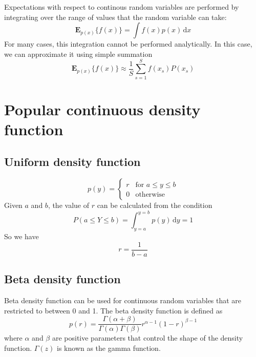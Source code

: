 \documentclass[a4paper,11pt]{article} %
\begin{document}
Expectations with respect to continous random variables are performed by integrating
over the range of values that the random variable can take:
\begin{equation}
\mathbf{E}_{p(x)}\{f(x)\} = \int f(x) p(x)\,\mathrm{d}x
\end{equation}
For many cases, this integration cannot be performed analytically. In this case, we can
approximate it using simple summation
\begin{equation}
\mathbf{E}_{p(x)}\{f(x)\} \approx \frac{1}{S}\sum_{s=1}^{S} f(x_s) P(x_s)
\end{equation}


\section{Popular continuous density function}

\subsection{Uniform density function}
\begin{equation}
p(y) = \begin{cases}
r & \text{for } a \leq y \leq b \\
0 & \text{otherwise}
\end{cases}
\end{equation}
Given $a$ and $b$, the value of $r$ can be calculated from the condition
\begin{equation*}
P(a \leq Y \leq b) = \int_{y=a}^{y=b} p(y)\,\mathrm{d}y = 1
\end{equation*}
So we have
\begin{equation*}
r = \frac{1}{b - a}
\end{equation*}


\subsection{Beta density function}

Beta density function can be used for continuous random variables that are restricted to
between 0 and 1. The beta density function is defined as
\begin{equation}
p(r) = \frac{\Gamma(\alpha + \beta)}{\Gamma(\alpha)\Gamma(\beta)}
r^{\alpha-1} (1 - r)^{\beta - 1}
\end{equation}
where $\alpha$ and $\beta$ are positive parameters that control the shape of the density function.
$\Gamma(z)$ is known as the gamma function.
\end{document}
